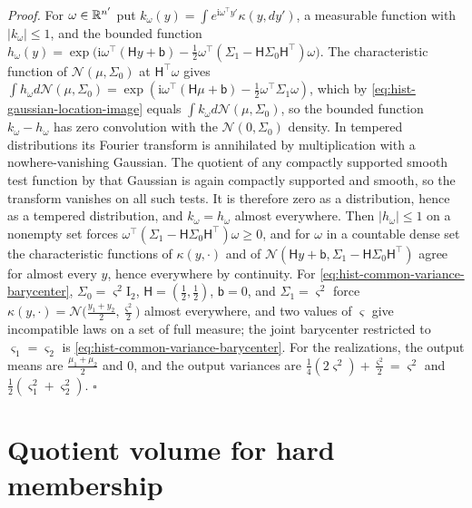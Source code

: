 \noindent\emph{Proof.}
For $\omega\in\mathbb R^{n'}$ put $k_\omega(y)=\int e^{\mathrm i\omega^\top y'}\kappa(y,dy')$, a
measurable function with $|k_\omega|\leq1$, and the bounded function
$h_\omega(y)=\exp\bigl(\mathrm i\omega^\top(\mathsf Hy+\mathsf
b)-\tfrac12\omega^\top(\Sigma_1-\mathsf H\Sigma_0\mathsf H^\top)\omega\bigr)$.  The
characteristic function of $\mathcal N(\mu,\Sigma_0)$ at $\mathsf H^\top\omega$ gives
$\int h_\omega d\mathcal N(\mu,\Sigma_0)=\exp(\mathrm i\omega^\top(\mathsf H\mu+\mathsf
b)-\tfrac12\omega^\top\Sigma_1\omega)$, which by \eqref{eq:hist-gaussian-location-image}
equals $\int k_\omega d\mathcal N(\mu,\Sigma_0)$, so the bounded function
$k_\omega-h_\omega$ has zero convolution with the $\mathcal N(0,\Sigma_0)$ density.  In
tempered distributions its Fourier transform is annihilated by multiplication with a
nowhere-vanishing Gaussian. The quotient of any compactly supported smooth test function by that
Gaussian is again compactly supported and smooth, so the transform vanishes on all such tests.
It is therefore zero as a distribution, hence as a tempered distribution, and
$k_\omega=h_\omega$ almost everywhere.  Then $|h_\omega|\leq1$ on a nonempty set forces
$\omega^\top(\Sigma_1-\mathsf H\Sigma_0\mathsf H^\top)\omega\geq0$, and for $\omega$ in a
countable dense set the characteristic functions of $\kappa(y,\cdot)$ and of
$\mathcal N(\mathsf Hy+\mathsf b,\Sigma_1-\mathsf H\Sigma_0\mathsf H^\top)$ agree for
almost every $y$, hence everywhere by continuity.  For
\eqref{eq:hist-common-variance-barycenter}, $\Sigma_0=\varsigma^2\mathrm I_2$,
$\mathsf H=(\tfrac12,\tfrac12)$, $\mathsf b=0$, and $\Sigma_1=\varsigma^2$ force
$\kappa(y,\cdot)=\mathcal N\bigl(\tfrac{y_1+y_2}{2},\tfrac{\varsigma^2}{2}\bigr)$ almost
everywhere, and two values of $\varsigma$ give incompatible laws on a set of full
measure; the joint barycenter restricted to $\varsigma_1=\varsigma_2$ is
\eqref{eq:hist-common-variance-barycenter}.  For the realizations, the output means are
$\tfrac{\mu_1+\mu_2}{2}$ and $0$, and the output variances are
$\tfrac14(2\varsigma^2)+\tfrac{\varsigma^2}2=\varsigma^2$ and
$\tfrac12(\varsigma_1^2+\varsigma_2^2)$.  $\square$

\section{Quotient volume for hard membership}
\label{sec:cg-quotient-volume}

